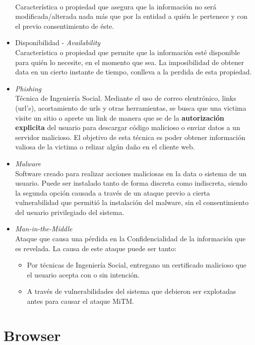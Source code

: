\begin{itemize}
        \\Característica o propiedad que asegura que la información no será modificada/alterada nada más que por la entidad a quién le pertenece y con el previo consentimiento de éste.
    \item Disponibilidad - \textit{Availability}
        \\Característica o propiedad que permite que la información esté disponible para quién lo necesite, en el momento que sea. La imposibilidad de obtener data en un cierto instante de tiempo, conlleva a la perdida de esta propiedad.
    \item \textit{Phishing}
        \\Técnica de Ingeniería Social. Mediante el uso de correo elentrónico, links (url's), acortamiento de urls y otras herramientas, se busca que una victima visite un sitio o aprete un link de manera que se de la \textbf{autorización explicita} del usuario para descargar código malicioso o enviar datos a un servidor malicioso. El objetivo de esta técnica es poder obtener información valiosa de la victima o relizar algún daño en el cliente web.
    \item \textit{Malware}
        \\Software creado para realizar acciones maliciosas en la data o sistema de un usuario. Puede ser instalado tanto de forma discreta como indiscreta, siendo la segunda opción causada a través de un ataque previo a cierta vulnerabilidad que permitió la instalación del malware, sin el consentimiento del usuario privilegiado del sistema.
    \item \textit{Man-in-the-Middle}
        \\Ataque que causa una pérdida en la Confidencialidad de la información que es revelada. La causa de este ataque puede ser tanto:
            \begin{itemize}
                \item Por técnicas de Ingeniería Social, entregano un certificado malicioso que el usuario acepta con o sin intención.
                \item A través de vulnerabilidades del sistema que debieron ser explotadas antes para causar el ataque MiTM.
            \end{itemize}
\end{itemize}


\section{Browser}
\label{chap2:Browser}


